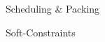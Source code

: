 \documentclass[10pt,xcolor={dvipsnames},fleqn]{beamer}
\begin{document}
%
%
%
%
%
%
%

\begin{frame}{Scheduling \& Packing}

\end{frame}

\begin{frame}{Soft-Constraints}

\end{frame}
\end{document}

